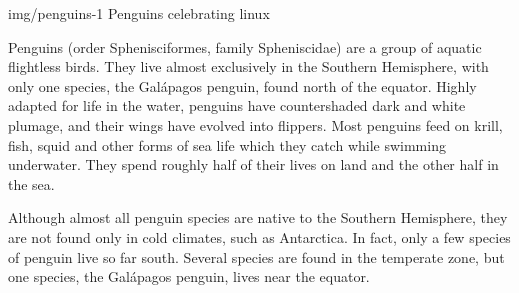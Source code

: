 \documentclass[oneside]{modern}
\begin{document}
  \leftimage
    {img/penguins-1}
    {Penguins celebrating linux}

  Penguins \cite{penguin} (order Sphenisciformes, family Spheniscidae) are a group of aquatic flightless birds.
  They live almost exclusively in the Southern Hemisphere,
  with only one species, the Galápagos penguin, found north of the equator.
  Highly adapted for life in the water, penguins have countershaded dark and
  white plumage, and their wings have evolved into flippers.
  Most penguins feed on krill, fish, squid and other forms of sea
  life which they catch while swimming underwater.
  They spend roughly half of their lives on land and the other half in the sea.


  Although almost all penguin species are native to the Southern Hemisphere,
  they are not found only in cold climates, such as Antarctica.
  In fact, only a few species of penguin live so far south.
  Several species are found in the temperate zone, but one species,
  the Galápagos penguin, lives near the equator.
\end{document}
